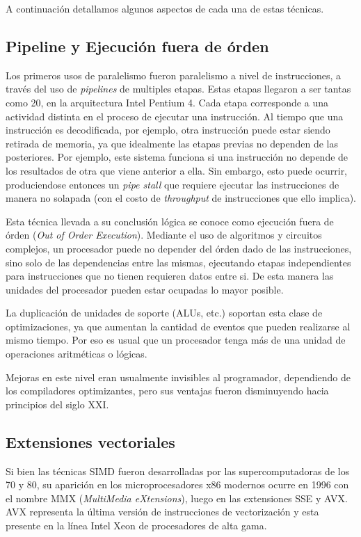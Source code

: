 A continuaci\'on detallamos algunos aspectos de cada una de estas t\'ecnicas.

\subsection{Pipeline y Ejecuci\'on fuera de \'orden}

Los primeros usos de paralelismo fueron paralelismo a nivel de instrucciones, a trav\'es del uso
de \textit{pipelines} de multiples etapas. Estas etapas llegaron a ser tantas como 20, en la arquitectura
Intel Pentium 4. Cada etapa corresponde a una actividad distinta en el proceso de ejecutar una instrucci\'on.
Al tiempo que una instrucci\'on es decodificada, por ejemplo, otra instrucci\'on puede estar siendo retirada
de memoria, ya que idealmente las etapas previas no dependen de las posteriores. Por ejemplo, este sistema funciona
si una instrucci\'on no depende de los resultados de otra que viene anterior a ella. Sin embargo, esto puede
ocurrir, produciendose entonces un \textit{pipe stall} que requiere ejecutar las instrucciones de manera no solapada 
(con el costo de \textit{throughput} de instrucciones que ello implica).

Esta t\'ecnica llevada a su conclusi\'on l\'ogica se conoce como ejecuci\'on fuera de \'orden (\textit{Out of Order
Execution}). Mediante el uso de algoritmos y circuitos complejos, un procesador puede no depender del \'orden dado
de las instrucciones, sino solo de las dependencias entre las mismas, ejecutando etapas independientes para
instrucciones que no tienen requieren datos entre si. De esta manera las unidades del procesador pueden estar
ocupadas lo mayor posible.

La duplicaci\'on de unidades de soporte (ALUs, etc.) soportan esta clase de optimizaciones,
ya que aumentan la cantidad de eventos que pueden realizarse al mismo tiempo. Por eso es usual que un procesador
tenga m\'as de una unidad de operaciones aritm\'eticas o l\'ogicas.

Mejoras en este nivel eran usualmente invisibles al programador, dependiendo de los compiladores optimizantes,
pero sus ventajas fueron disminuyendo hacia principios del siglo XXI.

\subsection{Extensiones vectoriales}

Si bien las t\'ecnicas SIMD fueron desarrolladas por las supercomputadoras de los 70 y 80, su aparici\'on en los
microprocesadores x86 modernos ocurre en 1996 con el nombre MMX (\textit{MultiMedia eXtensions}), luego en las
extensiones SSE y AVX. AVX representa la \'ultima versi\'on de instrucciones de vectorizaci\'on y esta presente
en la l\'inea Intel Xeon de procesadores de alta gama.

